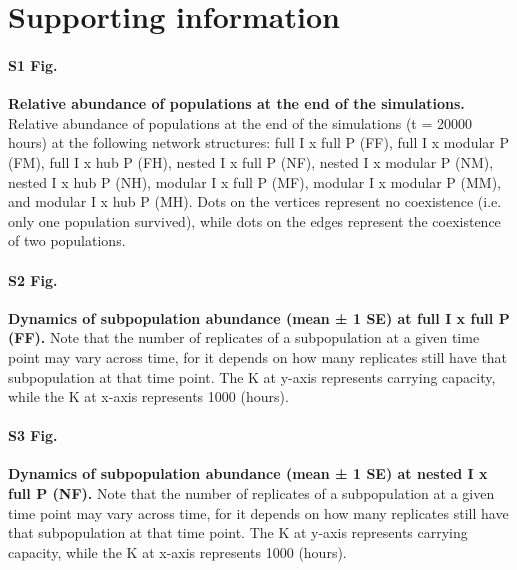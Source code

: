 \documentclass[10pt,letterpaper]{article}
\begin{document}
\section*{Supporting information}

\paragraph*{S1 Fig.}
\label{S1_Fig}
{\bf Relative abundance of populations at the end of the simulations.} Relative abundance of populations at the end of the simulations (t = 20000 hours) at the following network structures: full I x full P (FF), full I x modular P (FM), full I x hub P (FH), nested I x full P (NF), nested I x modular P (NM), nested I x hub P (NH), modular I x full P (MF), modular I x modular P (MM), and modular I x hub P (MH). Dots on the vertices represent no coexistence (i.e. only one population survived), while dots on the edges represent the coexistence of two populations.

\paragraph*{S2 Fig.}
\label{S2_Fig}
{\bf Dynamics of subpopulation abundance (mean ± 1 SE) at full I x full P (FF).} Note that the number of replicates of a subpopulation at a given time point may vary across time, for it depends on how many replicates still have that subpopulation at that time point. The K at y-axis represents carrying capacity, while the K at x-axis represents 1000 (hours).

\paragraph*{S3 Fig.}
\label{S3_Fig}
{\bf Dynamics of subpopulation abundance (mean ± 1 SE) at nested I x full P (NF).} Note that the number of replicates of a subpopulation at a given time point may vary across time, for it depends on how many replicates still have that subpopulation at that time point. The K at y-axis represents carrying capacity, while the K at x-axis represents 1000 (hours).
\end{document}
